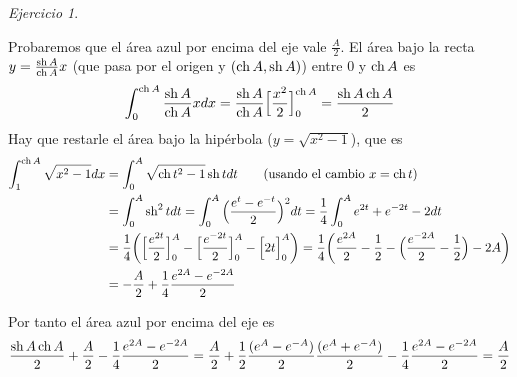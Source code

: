 \documentclass[12pt,spanish]{article}
\theoremstyle{definition}
\theoremstyle{remark}
\newtheorem{exercise}{Ejercicio}
\begin{document}
\begin{exercise}
\begin{enumerate}[i)]
    Probaremos que el área azul por encima del eje vale $\frac{A}{2}$.
    El área bajo la recta $y=\frac{\operatorname{sh} A}{\operatorname{ch} A}x$ (que pasa por el
    origen y $(\operatorname{ch} A,\operatorname{sh} A)$) entre $0$ y $\operatorname{ch} A$ es
    \[\int_0^{\operatorname{ch} A} \frac{\operatorname{sh} A}{\operatorname{ch} A}xdx=\frac{\operatorname{sh} A}{\operatorname{ch}
        A}\Big[\frac{x^2}{2}\Big]_0^{\operatorname{ch} A}=\frac{\operatorname{sh} A\operatorname{ch} A}{2}\] Hay
    que restarle el área bajo la hipérbola ($y=\sqrt{x^2-1}$), que es
    \begin{align*}\int_1^{\operatorname{ch} A}\sqrt{x^2-1}dx&=\int_0^A\sqrt{\operatorname{ch}
                                                t^2-1}\operatorname{sh} t dt \qquad\text{(usando el cambio $x=\operatorname{ch} t$)} \\
                                              &=\int_0^A \operatorname{sh}^2t dt=\int_0^A \Big(\frac{e^t-e^{-t}}{2}\Big)^2 dt = \frac{1}{4}\int_0^A e^{2t}+e^{-2t}-2dt \\
                                              &=\frac{1}{4}\bigg(\Big[\frac{e^{2t}}{2}\Big]_0^A-\Big[\frac{e^{-2t}}{2}\Big]_0^A-\Big[2t\Big]_0^A\bigg) = \frac{1}{4}\bigg(\frac{e^{2A}}{2}-\frac{1}{2}-\Big(\frac{e^{-2A}}{2}-\frac{1}{2}\Big)-2A\bigg) \\
      &= -\frac{A}{2} +\frac{1}{4} \frac{e^{2A}-e^{-2A}}{2}
    \end{align*}

    Por tanto el área azul por encima del eje es
    \begin{align*}
      \frac{\operatorname{sh} A\operatorname{ch} A}{2} +\frac{A}{2} - \frac{1}{4} \frac{e^{2A}-e^{-2A}}{2} = \frac{A}{2} + \frac{1}{2}\frac{(e^A-e^{-A})}{2}\frac{(e^A+e^{-A})}{2}-\frac{1}{4}\frac{e^{2A}-e^{-2A}}{2}=\frac{A}{2}
    \end{align*}
  \end{enumerate}
\end{exercise}

\newcommand{\T}{T_1(\mathbb{S}^2)}
\newcommand{\E}{\mathcal{E}_*(e)}
\end{document}
